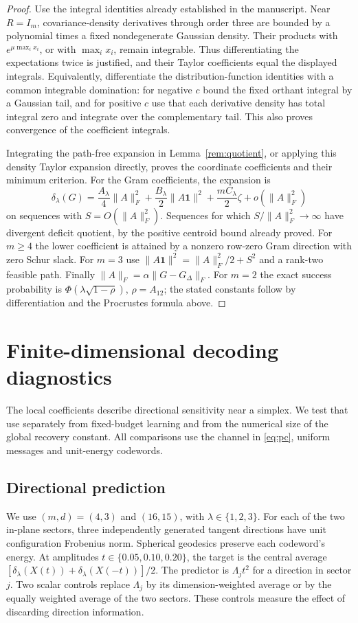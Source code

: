 \documentclass[11pt]{article}
\theoremstyle{remark}\newtheorem{remark}[theorem]{Remark}
\newcommand{\one}{\mathbf 1}
\begin{document}
\begin{proof}
Use the integral identities already established in the manuscript.
Near $R=I_m$, covariance-density derivatives through order three are
bounded by a polynomial times a fixed nondegenerate Gaussian density.
Their products with $e^{\mu\max_i x_i}$, or with $\max_i x_i$, remain
integrable.  Thus differentiating the expectations twice is justified,
and their Taylor coefficients equal the displayed integrals.  Equivalently,
differentiate the distribution-function identities with a common
integrable domination: for negative $c$ bound the fixed orthant integral
by a Gaussian tail, and for positive $c$ use that each derivative density
has total integral zero and integrate over the complementary tail.
This also proves convergence of the coefficient integrals.

Integrating the path-free expansion in Lemma~\ref{rem:quotient}, or
applying this density Taylor expansion directly, proves the coordinate
coefficients and their minimum criterion.  For the Gram coefficients,
the expansion is
\[
 \delta_\lambda(G)
 =\frac{A_\lambda}{4}\|A\|_F^2+
   \frac{B_\lambda}{2}\|A\one\|^2+
   \frac{mC_\lambda}{2}\zeta+o(\|A\|_F^2)
\]
on sequences with $S=O(\|A\|_F^2)$.  Sequences for which
$S/\|A\|_F^2\to\infty$ have divergent deficit quotient, by the positive
centroid bound already proved.  For $m\ge4$ the lower coefficient is
attained by a nonzero row-zero Gram direction with zero Schur slack.
For $m=3$ use
$\|A\one\|^2=\|A\|_F^2/2+S^2$ and a rank-two feasible path.
Finally $\|A\|_F=\alpha\|G-G_\Delta\|_F$.
For $m=2$ the exact success probability is
$\Phi(\lambda\sqrt{1-\rho})$, $\rho=A_{12}$; the stated constants follow
by differentiation and the Procrustes formula above.
\end{proof}

\section{Finite-dimensional decoding diagnostics}\label{sec:application}
The local coefficients describe directional sensitivity near a simplex.
We test that use separately from fixed-budget learning and from the numerical
size of the global recovery constant. All comparisons use the channel in
\eqref{eq:pc}, uniform messages and unit-energy codewords.

\subsection{Directional prediction}
We use $(m,d)=(4,3)$ and $(16,15)$, with $\lambda\in\{1,2,3\}$.
For each of the two in-plane sectors, three independently generated tangent
directions have unit configuration Frobenius norm. Spherical geodesics preserve
each codeword's energy. At amplitudes $t\in\{0.05,0.10,0.20\}$, the target is
the central average $[\delta_\lambda(X(t))+\delta_\lambda(X(-t))]/2$.
The predictor is $\Lambda_jt^2$ for a direction in sector $j$.
Two scalar controls replace $\Lambda_j$ by its dimension-weighted average or
by the equally weighted average of the two sectors.
These controls measure the effect of discarding direction information.
\end{document}
